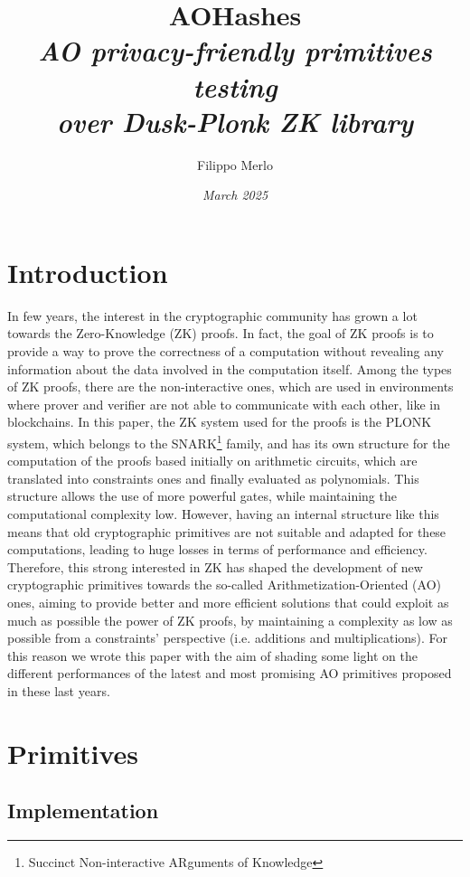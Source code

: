 \documentclass[12pt, a4paper]{report}
\title{{\textbf{AOHashes}}\\[20pt]\textsl{AO privacy-friendly primitives testing\\over Dusk-Plonk ZK library}}
\author{\Large{Filippo Merlo}}
\date{\textit{March 2025}}
\begin{document}
\maketitle
\newpage
{}
\tableofcontents
\pagebreak

\chapter{Introduction}\label{chap:intro}

In few years, the interest in the cryptographic community has grown a lot towards the Zero-Knowledge (ZK) proofs. In fact, the goal of ZK proofs is to provide a way to prove the correctness of a computation without revealing any information about the data involved in the computation itself. Among the types of ZK proofs, there are the non-interactive ones, which are used in environments where prover and verifier are not able to communicate with each other, like in blockchains. In this paper, the ZK system used for the proofs is the PLONK system, which belongs to the SNARK\footnote{Succinct Non-interactive ARguments of Knowledge} family, and has its own structure for the computation of the proofs based initially on arithmetic circuits, which are translated into constraints ones and finally evaluated as polynomials. This structure allows the use of more powerful gates, while maintaining the computational complexity low.
However, having an internal structure like this means that old cryptographic primitives are not suitable and adapted for these computations, leading to huge losses in terms of performance and efficiency. Therefore, this strong interested in ZK has shaped the development of new cryptographic primitives towards the so-called Arithmetization-Oriented (AO) ones, aiming to provide better and more efficient solutions that could exploit as much as possible the power of ZK proofs, by maintaining a complexity as low as possible from a constraints' perspective (i.e. additions and multiplications). For this reason we wrote this paper with the aim of shading some light on the different performances of the latest and most promising AO primitives proposed in these last years.

\chapter{Primitives}\label{chap:primitives}

\section{Implementation}\label{chap:implementation}
\end{document}
